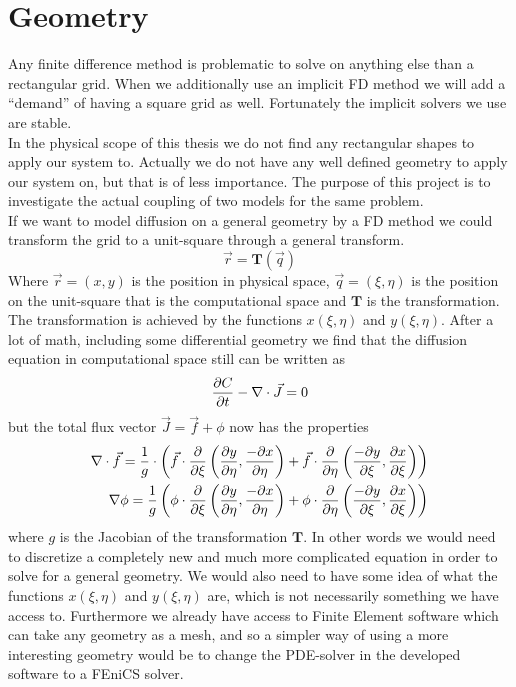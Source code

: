 \section{Geometry}
Any finite difference method is problematic to solve on anything else than a rectangular grid. 
When we additionally use an implicit FD method we will add a ``demand'' of having a square grid as well. 
Fortunately the implicit solvers we use are stable. \\
In the physical scope of this thesis we do not find any rectangular shapes to apply our system to. 
Actually we do not have any well defined geometry to apply our system on, but that is of less importance. 
The purpose of this project is to investigate the actual coupling of two models for the same problem. \\
If we want to model diffusion on a general geometry by a FD method we could transform the grid to a unit-square through a general transform.
\begin{equation*}
 \vec{r} = \mathbf{T}(\vec{q})
\end{equation*}
Where $\vec{r} = (x,y)$ is the position in physical space, $\vec{q} = (\xi,\eta)$ is the position on the unit-square that is the computational space and $\mathbf{T}$  is the transformation. The transformation is achieved by the functions $x(\xi,\eta)$ and $y(\xi,\eta)$. After a lot of math, including some differential geometry we find that the diffusion equation in computational space still can be written as
\begin{equation*}
 \frac{\partial C}{\partial t} -\nabla\cdot\vec{J} = 0
\end{equation*}
but the total flux vector $\vec{J} = \vec{f} + \phi$ now has the properties
\begin{align*}
 \nabla\cdot\vec{f} = \frac{1}{g}\cdot\left(\vec{f}\cdot\frac{\partial}{\partial\xi}\left(\frac{\partial y}{\partial\eta},\frac{-\partial x}{\partial \eta}\right) + \vec{f}\cdot\frac{\partial}{\partial\eta}\left(\frac{-\partial y}{\partial\xi},\frac{\partial x}{\partial \xi}\right)\right) \\
 \nabla\phi = \frac{1}{g}\left(\phi\cdot\frac{\partial}{\partial\xi}\left(\frac{\partial y}{\partial\eta},\frac{-\partial x}{\partial\eta}\right)+\phi\cdot\frac{\partial}{\partial\eta}\left(\frac{-\partial y}{\partial\xi},\frac{\partial x}{\partial\xi}\right)\right)
\end{align*}
where $g$ is the Jacobian of the transformation $\mathbf{T}$. In other words we would need to discretize a completely new and much more complicated equation in order to solve for a general geometry. We would also need to have some idea of what the functions $x(\xi,\eta)$ and $y(\xi,\eta)$ are, which is not necessarily something we have access to. 
Furthermore we already have access to Finite Element software which can take any geometry as a mesh, and so a simpler way of using a more interesting geometry would be to change the PDE-solver in the developed software to a FEniCS solver.

